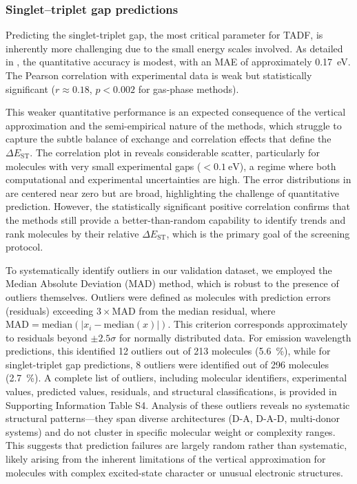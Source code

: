 \documentclass[journal=jcisd8,manuscript=article,keywords=true]{achemso}
\newcommand{\deltaest}{$\Delta E_{\text{ST}}$}
\begin{document}
\subsubsection{Singlet--triplet gap predictions}

Predicting the singlet-triplet gap, the most critical parameter for TADF, is inherently
more challenging due to the small energy scales involved. As detailed in
, the quantitative accuracy is modest, with an MAE of
approximately \qty{0.17}{\electronvolt}. The Pearson correlation with experimental data is
weak but statistically significant ($r \approx \num{0.18}$, $p < 0.002$ for gas-phase
methods).

This weaker quantitative performance is an expected consequence of the vertical
approximation and the semi-empirical nature of the methods, which struggle to capture the
subtle balance of exchange and correlation effects that define the \deltaest. The
correlation plot in  reveals considerable scatter, particularly for
molecules with very small experimental gaps ($< \qty{0.1}{\electronvolt}$), a regime where
both computational and experimental uncertainties are high. The error distributions in
 are centered near zero but are broad, highlighting the challenge of
quantitative prediction. However, the statistically significant positive correlation
confirms that the methods still provide a better-than-random capability to identify trends
and rank molecules by their relative \deltaest, which is the primary goal of the screening
protocol.

To systematically identify outliers in our validation dataset, we employed the Median Absolute Deviation (MAD) method, which is robust to the presence of 
outliers themselves. Outliers were defined as molecules with prediction errors (residuals) exceeding $3 \times \text{MAD}$ from the median residual, where 
$\text{MAD} = \text{median}(|x_i - \text{median}(x)|)$. This criterion corresponds approximately to residuals beyond $\pm 2.5\sigma$ for normally distributed 
data. For emission wavelength predictions, this identified \num{12} outliers out of \num{213} molecules (\qty{5.6}{\percent}), while for singlet-triplet gap 
predictions, \num{8} outliers were identified out of \num{296} molecules (\qty{2.7}{\percent}). A complete list of outliers, including molecular identifiers, 
experimental values, predicted values, residuals, and structural classifications, is provided in Supporting Information Table S4. Analysis of these outliers 
reveals no systematic structural patterns—they span diverse architectures (D-A, D-A-D, multi-donor systems) and do not cluster in specific molecular weight or 
complexity ranges. This suggests that prediction failures are largely random rather than systematic, likely arising from the inherent limitations of the 
vertical approximation for molecules with complex excited-state character or unusual electronic structures.
\end{document}
